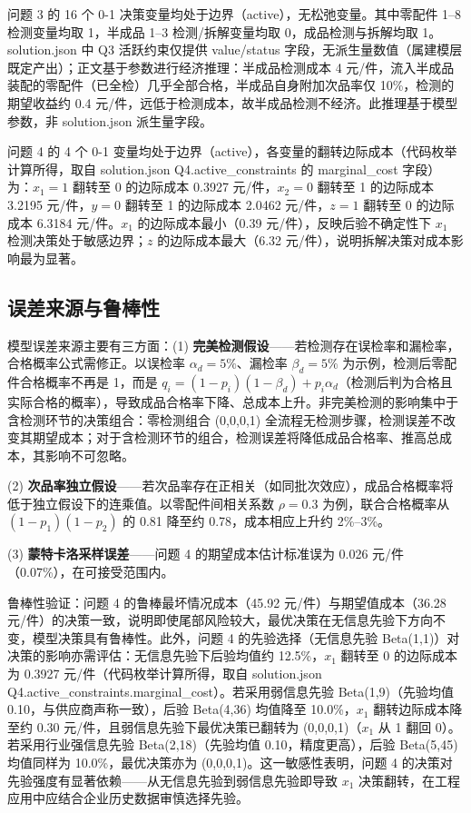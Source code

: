 \documentclass[12pt,a4paper]{ctexart}
\begin{document}
问题 3 的 16 个 0-1 决策变量均处于边界（active），无松弛变量。其中零配件 1--8 检测变量均取 1，半成品 1--3 检测/拆解变量均取 0，成品检测与拆解均取 1。solution.json 中 Q3 活跃约束仅提供 value/status 字段，无派生量数值（属建模层既定产出）；正文基于参数进行经济推理：半成品检测成本 4 元/件，流入半成品装配的零配件（已全检）几乎全部合格，半成品自身附加次品率仅 10\%，检测的期望收益约 0.4 元/件，远低于检测成本，故半成品检测不经济。此推理基于模型参数，非 solution.json 派生量字段。

问题 4 的 4 个 0-1 变量均处于边界（active），各变量的翻转边际成本（代码枚举计算所得，取自 solution.json Q4.active\_constraints 的 marginal\_cost 字段）为：$x_1=1$ 翻转至 0 的边际成本 0.3927 元/件，$x_2=0$ 翻转至 1 的边际成本 3.2195 元/件，$y=0$ 翻转至 1 的边际成本 2.0462 元/件，$z=1$ 翻转至 0 的边际成本 6.3184 元/件。$x_1$ 的边际成本最小（0.39 元/件），反映后验不确定性下 $x_1$ 检测决策处于敏感边界；$z$ 的边际成本最大（6.32 元/件），说明拆解决策对成本影响最为显著。

\subsection{误差来源与鲁棒性}

模型误差来源主要有三方面：(1) \textbf{完美检测假设}——若检测存在误检率和漏检率，合格概率公式需修正。以误检率 $\alpha_d=5\%$、漏检率 $\beta_d=5\%$ 为示例，检测后零配件合格概率不再是 1，而是 $q_i = (1-p_i)(1-\beta_d) + p_i\alpha_d$（检测后判为合格且实际合格的概率），导致成品合格率下降、总成本上升。非完美检测的影响集中于含检测环节的决策组合：零检测组合 (0,0,0,1) 全流程无检测步骤，检测误差不改变其期望成本；对于含检测环节的组合，检测误差将降低成品合格率、推高总成本，其影响不可忽略。

(2) \textbf{次品率独立假设}——若次品率存在正相关（如同批次效应），成品合格概率将低于独立假设下的连乘值。以零配件间相关系数 $\rho=0.3$ 为例，联合合格概率从 $(1-p_1)(1-p_2)$ 的 0.81 降至约 0.78，成本相应上升约 2\%--3\%。

(3) \textbf{蒙特卡洛采样误差}——问题 4 的期望成本估计标准误为 0.026 元/件（0.07\%），在可接受范围内。

鲁棒性验证：问题 4 的鲁棒最坏情况成本（45.92 元/件）与期望值成本（36.28 元/件）的决策一致，说明即使尾部风险较大，最优决策在无信息先验下方向不变，模型决策具有鲁棒性。此外，问题 4 的先验选择（无信息先验 Beta(1,1)）对决策的影响亦需评估：无信息先验下后验均值约 12.5\%，$x_1$ 翻转至 0 的边际成本为 0.3927 元/件（代码枚举计算所得，取自 solution.json Q4.active\_constraints.marginal\_cost）。若采用弱信息先验 Beta(1,9)（先验均值 0.10，与供应商声称一致），后验 Beta(4,36) 均值降至 10.0\%，$x_1$ 翻转边际成本降至约 0.30 元/件，且弱信息先验下最优决策已翻转为 (0,0,0,1)（$x_1$ 从 1 翻回 0）。若采用行业强信息先验 Beta(2,18)（先验均值 0.10，精度更高），后验 Beta(5,45) 均值同样为 10.0\%，最优决策亦为 (0,0,0,1)。这一敏感性表明，问题 4 的决策对先验强度有显著依赖——从无信息先验到弱信息先验即导致 $x_1$ 决策翻转，在工程应用中应结合企业历史数据审慎选择先验。
\end{document}

